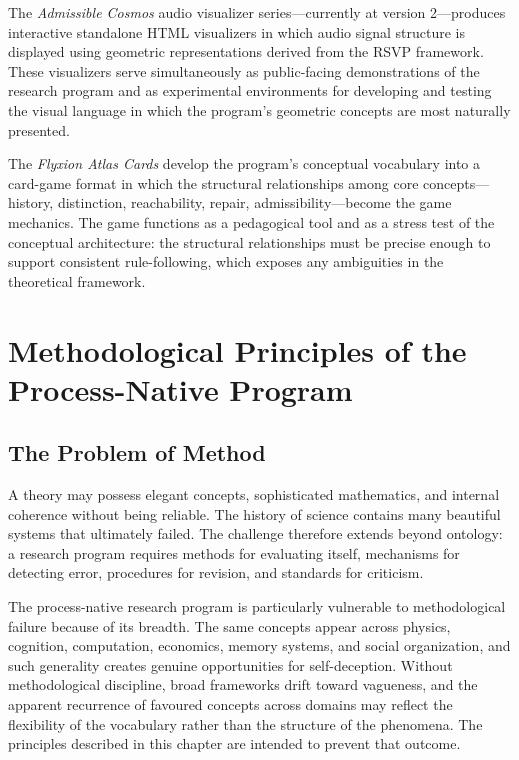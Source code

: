 \documentclass[11pt, oneside]{book}
\theoremstyle{definition}
\theoremstyle{remark}
\begin{document}
The \textit{Admissible Cosmos} audio visualizer series—currently at version 2—produces interactive standalone HTML visualizers in which audio signal structure is displayed using geometric representations derived from the RSVP framework. These visualizers serve simultaneously as public-facing demonstrations of the research program and as experimental environments for developing and testing the visual language in which the program's geometric concepts are most naturally presented.

The \textit{Flyxion Atlas Cards} develop the program's conceptual vocabulary into a card-game format in which the structural relationships among core concepts—history, distinction, reachability, repair, admissibility—become the game mechanics. The game functions as a pedagogical tool and as a stress test of the conceptual architecture: the structural relationships must be precise enough to support consistent rule-following, which exposes any ambiguities in the theoretical framework.

\chapter{Methodological Principles of the Process-Native Program}

\section{The Problem of Method}

A theory may possess elegant concepts, sophisticated mathematics, and internal coherence without being reliable. The history of science contains many beautiful systems that ultimately failed. The challenge therefore extends beyond ontology: a research program requires methods for evaluating itself, mechanisms for detecting error, procedures for revision, and standards for criticism.

The process-native research program is particularly vulnerable to methodological failure because of its breadth. The same concepts appear across physics, cognition, computation, economics, memory systems, and social organization, and such generality creates genuine opportunities for self-deception. Without methodological discipline, broad frameworks drift toward vagueness, and the apparent recurrence of favoured concepts across domains may reflect the flexibility of the vocabulary rather than the structure of the phenomena. The principles described in this chapter are intended to prevent that outcome.
\end{document}
